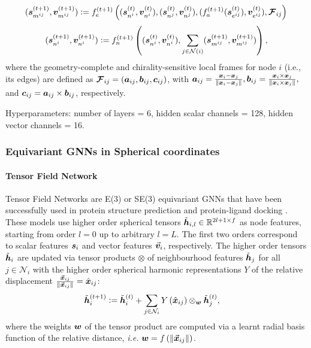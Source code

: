 \begin{equation}
    ({\bm{s}}_{m^{ij}}^{(t+1)}, {\bm{v}}_{m^{ij}}^{(t+1)}) \vcentcolon= f_{e}^{(t+1)}\left(({\bm{s}}_{n^{i}}^{(t)}, {\bm{v}}_{n^{i}}^{(t)}),({\bm{s}}_{n^{j}}^{(t)}, {\bm{v}}_{n^{j}}^{(t)}),(f_{a}^{(t + 1)}({\bm{s}}_{e^{ij}}^{(t)}), {\bm{v}}_{e^{ij}}^{(t)}),\bm{\mathcal{F}}_{ij}\right)
\end{equation}
\begin{equation}
    ({\bm{s}}_{n^{i}}^{(t+1)}, {\bm{v}}_{n^{i}}^{(t+1)}) \vcentcolon= f_{n}^{(t+1)}\left(({\bm{s}}_{n^{i}}^{(t)}, {\bm{v}}_{n^{i}}^{(t)}), \sum_{j \in \mathcal{N}(i)} ({\bm{s}}_{m^{ij}}^{(t+1)}, {\bm{v}}_{m^{ij}}^{(t+1)}) \right),
\end{equation}
where the geometry-complete and chirality-sensitive local frames for node $i$ (i.e., its edges) are defined as $\bm{\mathcal{F}}_{ij} = ({\bm{a}}_{ij}, {\bm{b}}_{ij}, {\bm{c}}_{ij})$, with ${\bm{a}}_{ij} = \frac{{\bm{x}}_{i} - {\bm{x}}_{j}}{ \lVert {\bm{x}}_{i} - {\bm{x}}_{j} \rVert }, {\bm{b}}_{ij} = \frac{{\bm{x}}_{i} \times {\bm{x}}_{j}}{ \lVert {\bm{x}}_{i} \times {\bm{x}}_{j} \rVert },$ and ${\bm{c}}_{ij} = {\bm{a}}_{ij} \times {\bm{b}}_{ij}$, respectively.

Hyperparameters: number of layers = 6, hidden scalar channels = 128, hidden vector channels = 16.

\subsubsection{Equivariant GNNs in Spherical coordinates}

\paragraph{Tensor Field Network \citep{thomas2018tensor}}
Tensor Field Networks are E(3) or SE(3) equivariant GNNs that have been successfully used in protein structure prediction \citep{baek2021accurate} and protein-ligand docking \citep{corso2023diffdock}.
These models use higher order spherical tensors $\tilde {{\bm{h}}}_{i,l} \in \mathbb{R}^{2l+1 \times f}$ as node features, starting from order $l = 0$ up to arbitrary $l = L$.
The first two orders correspond to scalar features ${\bm{s}}_i$ and vector features $\vec{{\bm{v}}}_i$, respectively.
The higher order tensors $\tilde {{\bm{h}}}_{i}$ are updated via tensor products $\otimes$ of neighbourhood features $\tilde {{\bm{h}}}_{j}$ for all $j \in \mathcal{N}_i$ with the higher order spherical harmonic representations $Y$ of the relative displacement $\frac{\vec{{\bm{x}}}_{ij}}{\Vert \vec{{\bm{x}}}_{ij} \Vert} = \hat{{\bm{x}}}_{ij}$:
\begin{align}
\label{eq:e3nn-1}
     \tilde {{\bm{h}}}_{i}^{(t+1)} & \vcentcolon= \tilde {{\bm{h}}}_{i}^{(t)} + \sum_{j \in \mathcal{N}_i} Y \left( \hat{{\bm{x}}}_{ij} \right) \otimes_{{\bm{w}}} \tilde {{\bm{h}}}_{j}^{(t)} ,
\end{align}
where the weights ${\bm{w}}$ of the tensor product are computed via a learnt radial basis function of the relative distance, \textit{i.e.} ${\bm{w}} = f \left( \Vert \vec{{\bm{x}}}_{ij} \Vert \right)$.

